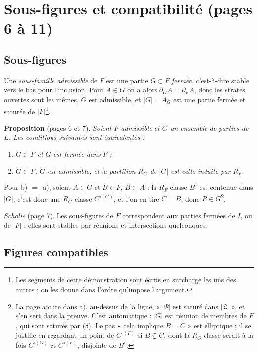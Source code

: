 \documentclass[11pt,a4paper]{article}
\begin{document}
\section*{Sous-figures et compatibilité (pages 6 à 11)}

\subsection*{Sous-figures}

Une \emph{sous-famille admissible} de $F$ est une partie $G \subset F$
\emph{fermée}, c'est-à-dire stable vers le bas pour l'inclusion. Pour $A \in G$
on a alors $\partial_{G} A = \partial_{F} A$, donc les strates ouvertes sont les
mêmes, $G$ est admissible, et $|G| = A_{G}$ est une partie fermée et saturée
de $|F|$\footnote{Les segments de cette démonstration sont écrits en surcharge
les uns des autres ; on les donne dans l'ordre qu'impose l'argument.}.

\textbf{Proposition} (pages 6 et 7). \emph{Soient $F$ admissible et $G$ un
ensemble de parties de $L$. Les conditions suivantes sont équivalentes :}
\begin{enumerate}
\item[a)] \emph{$G \subset F$ et $G$ est fermée dans $F$ ;}
\item[b)] \emph{$G \subset F$, $G$ est admissible, et la partition $R_{G}$ de
$|G|$ est celle induite par $R_{F}$.}
\end{enumerate}

Pour b) $\Rightarrow$ a), soient $A \in G$ et $B \in F$, $B \subset A$ : la
$R_{F}$-classe $B^{\circ}$ est contenue dans $|G|$, c'est donc une $R_{G}$-classe
$C^{\circ (G)}$, et l'on en tire $C = B$, donc $B \in G$\footnote{La page ajoute
dans a), au-dessus de la ligne, « $|\Psi|$ est saturé dans $|\mathfrak{L}|$ »,
et s'en sert dans la preuve. C'est automatique : $|G|$ est réunion de membres de
$F$, qui sont saturés par ($\delta$). Le pas « cela implique $B = C$ » est
elliptique ; il se justifie en regardant un point de $C^{\circ (F)}$ si $B
\subsetneq C$, dont la $R_{G}$-classe serait à la fois $C^{\circ(G)}$ et
$C^{\circ(F)}$, disjointe de $B^{\circ}$.}.

\emph{Scholie} (page 7). Les sous-figures de $F$ correspondent aux parties
fermées de $I$, ou de $|F|$ ; elles sont stables par réunions et intersections
quelconques.

\subsection*{Figures compatibles}
\end{document}
